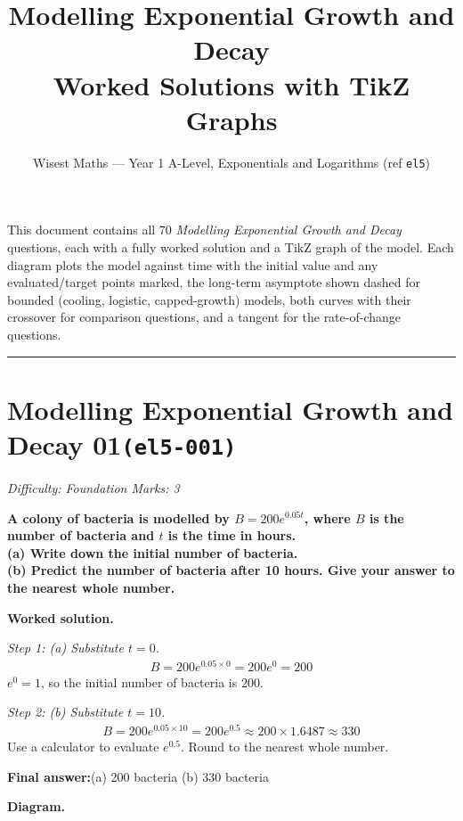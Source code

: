 \documentclass[11pt]{article}
\title{\textbf{Modelling Exponential Growth and Decay}\\[0.3em]\large Worked Solutions with TikZ Graphs}
\author{Wisest Maths --- Year 1 A-Level, Exponentials and Logarithms (ref \texttt{el5})}
\date{}
\newcommand{\question}[1]{\par\medskip\noindent\textbf{#1}\par}
\begin{document}
\maketitle
\noindent This document contains all 70 \emph{Modelling Exponential Growth and Decay} questions,
each with a fully worked solution and a TikZ graph of the model. Each diagram plots the model against time with
the initial value and any evaluated/target points marked, the long-term asymptote shown dashed for bounded
(cooling, logistic, capped-growth) models, both curves with their crossover for comparison questions, and a
tangent for the rate-of-change questions.
\tableofcontents
\bigskip
\hrule

\section*{Modelling Exponential Growth and Decay 01\quad\small\texttt{(el5-001)}}
\textit{Difficulty: Foundation \quad\textbar\quad Marks: 3}

\question{A colony of bacteria is modelled by \( B = 200e^{0.05t} \), where \( B \) is the number of bacteria and \( t \) is the time in hours. \\[3pt]  (a) Write down the initial number of bacteria. \\[3pt]  (b) Predict the number of bacteria after 10 hours. Give your answer to the nearest whole number.}

\textbf{Worked solution.}

\textit{Step 1: (a) Substitute \( t = 0 \).}
\[\begin{gathered}
B = 200e^{0.05 \times 0} = 200e^0 = 200
\end{gathered}\]
\( e^0 = 1 \), so the initial number of bacteria is 200.

\textit{Step 2: (b) Substitute \( t = 10 \).}
\[\begin{gathered}
B = 200e^{0.05 \times 10} = 200e^{0.5} \approx 200 \times 1.6487 \approx 330
\end{gathered}\]
Use a calculator to evaluate \( e^{0.5} \). Round to the nearest whole number.

\begin{answerbox}
\textbf{Final answer:}\quad (a) 200 bacteria \quad  (b) 330 bacteria
\end{answerbox}
\textbf{Diagram.}
\end{document}
